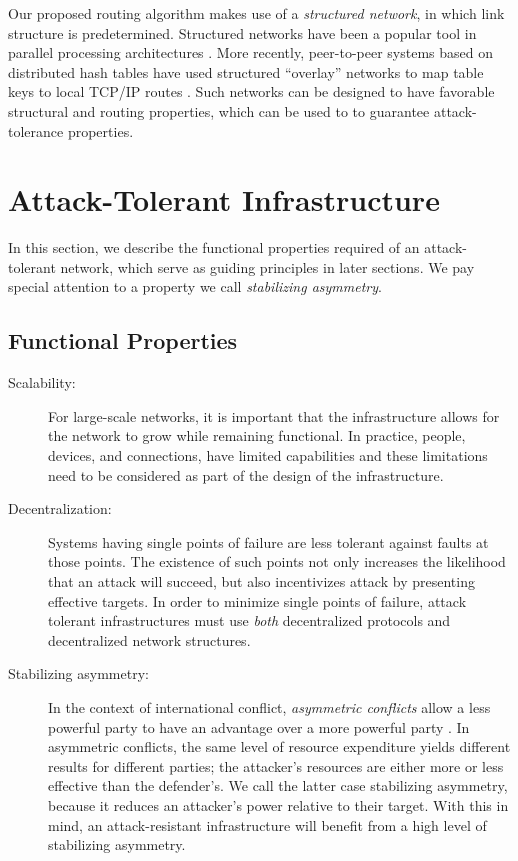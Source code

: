 \documentclass{sig-alternate-05-2015}
\begin{document}
Our proposed routing algorithm makes use of a
{\em structured network}, in which link structure is predetermined.
Structured networks have been a popular tool in parallel processing
architectures \cite{kshemkalyani_distributed_2008}.
More recently, peer-to-peer systems based on distributed hash tables have used
structured ``overlay'' networks to map table keys to local TCP/IP routes
\cite{lua_survey_2005,korzun_structured_2013}.
Such networks can be designed to have favorable structural and routing
properties,
which can be used to to guarantee attack-tolerance properties.

\section{Attack-Tolerant Infrastructure}
\label{sec-infrastructure}

In this section, we describe the functional properties required of an
attack-tolerant network,
which serve as guiding principles in later sections.
We pay special attention to a property we call
{\em stabilizing asymmetry}.

\subsection{Functional Properties}

\begin{description}
\item[Scalability:]
For large-scale networks, it is important that the infrastructure allows
for the network to grow while remaining functional.
In practice, people, devices, and connections, have limited capabilities
and these limitations need to be considered as part of the design of the
infrastructure. 

\item [Decentralization:]
Systems having single points of failure are less tolerant against faults at
those points.
The existence of such points not only increases the likelihood that an attack
will succeed,
but also incentivizes attack by presenting effective targets.
In order to minimize single points of failure,
attack tolerant infrastructures must use {\em both} decentralized protocols and
decentralized network structures.

\item[Stabilizing asymmetry:]
In the context of international conflict,
{\em asymmetric conflicts} allow a
less powerful party to have an advantage over a more powerful party
\cite{mack_why_1975}.
In asymmetric conflicts, the same level of resource expenditure yields different
results for different parties;
the attacker's resources are either more or less effective than the defender's.
We call the latter case stabilizing asymmetry,
because it reduces an attacker's power relative to their target.
With this in mind, an attack-resistant infrastructure will benefit from a high
level of stabilizing asymmetry.

\end{description}
\end{document}
